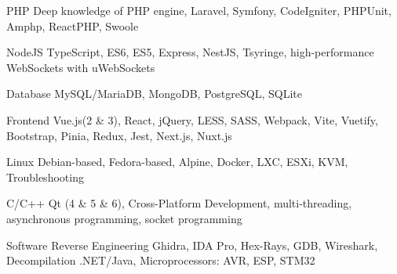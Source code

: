 
\begin{cvskills}

  \cvskill
    {PHP} %
    {Deep knowledge of PHP engine, Laravel, Symfony, CodeIgniter, PHPUnit, Amphp, ReactPHP, Swoole} %

  \cvskill
    {NodeJS} %
    {TypeScript, ES6, ES5, Express, NestJS, Tsyringe, high-performance WebSockets with uWebSockets} %

  \cvskill
    {Database} %
    {MySQL/MariaDB, MongoDB, PostgreSQL, SQLite} %

    \cvskill
      {Frontend} %
      {Vue.js(2 \& 3), React, jQuery, LESS, SASS, Webpack, Vite, Vuetify, Bootstrap, Pinia, Redux, Jest, Next.js, Nuxt.js} %

    \cvskill
      {Linux} %
      {Debian-based, Fedora-based, Alpine, Docker, LXC, ESXi, KVM, Troubleshooting} %

    \cvskill
      {C/C++} %
      {Qt (4 \& 5 \& 6), Cross-Platform Development, multi-threading, asynchronous programming, socket programming} %

    \cvskill
      {Software Reverse Engineering} %
      {Ghidra, IDA Pro, Hex-Rays, GDB, Wireshark, Decompilation .NET/Java, Microprocessors: AVR, ESP, STM32} %

\end{cvskills}
